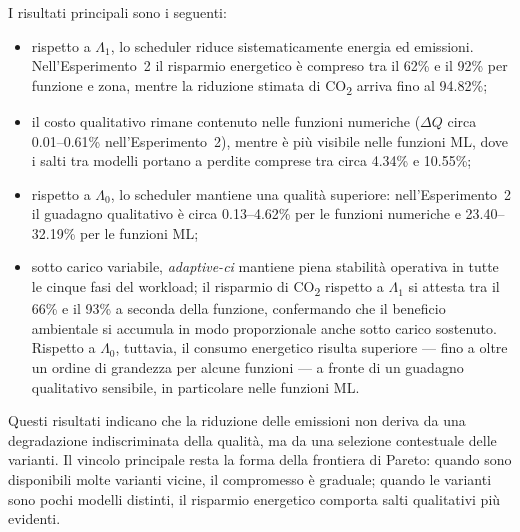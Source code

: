 I risultati principali sono i seguenti:
%
\begin{itemize}
  \item rispetto a $\Lambda_1$, lo scheduler riduce sistematicamente
        energia ed emissioni. Nell'Esperimento~2 il risparmio energetico
        è compreso tra il 62\% e il 92\% per funzione e zona, mentre la riduzione
        stimata di CO\textsubscript{2} arriva fino al 94.82\%;
  \item il costo qualitativo rimane contenuto nelle funzioni numeriche
        ($\Delta Q$ circa 0.01--0.61\% nell'Esperimento~2), mentre è più
        visibile nelle funzioni ML, dove i salti tra modelli portano a
        perdite comprese tra circa 4.34\% e 10.55\%;
  \item rispetto a $\Lambda_0$, lo scheduler mantiene una qualità
        superiore: nell'Esperimento~2 il guadagno qualitativo è circa
        0.13--4.62\% per le funzioni numeriche e 23.40--32.19\% per le
        funzioni ML;
  \item sotto carico variabile,
        \emph{adaptive-ci} mantiene piena stabilità operativa in tutte le
        cinque fasi del workload; il risparmio di CO\textsubscript{2}
        rispetto a $\Lambda_1$ si attesta tra il 66\% e il 93\% a seconda
        della funzione, confermando che il beneficio ambientale si accumula
        in modo proporzionale anche sotto carico sostenuto. Rispetto a
        $\Lambda_0$, tuttavia, il consumo energetico risulta superiore ---
        fino a oltre un ordine di grandezza per alcune funzioni --- a
        fronte di un guadagno qualitativo sensibile, in particolare nelle
        funzioni ML\@.
\end{itemize}

Questi risultati indicano che la riduzione delle emissioni non deriva da
una degradazione indiscriminata della qualità, ma da una selezione
contestuale delle varianti. Il vincolo principale resta la forma della
frontiera di Pareto: quando sono disponibili molte varianti vicine, il
compromesso è graduale; quando le varianti sono pochi modelli distinti,
il risparmio energetico comporta salti qualitativi più evidenti.
